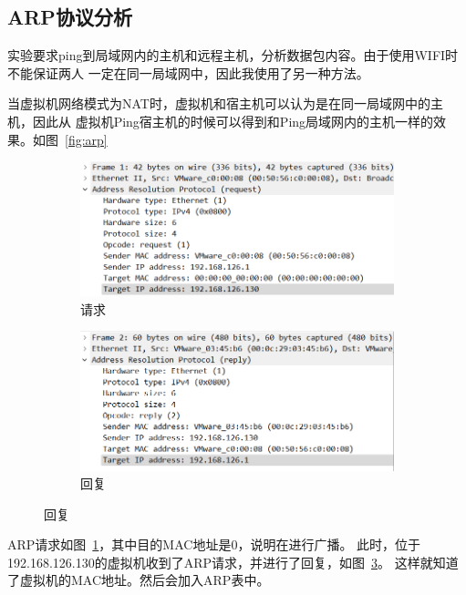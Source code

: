\documentclass[a4paper,twoside]{article}
\begin{document}
\begin{spacing}{1.2}
\subsection{ARP协议分析}

实验要求ping到局域网内的主机和远程主机，分析数据包内容。由于使用WIFI时不能保证两人
一定在同一局域网中，因此我使用了另一种方法。

当虚拟机网络模式为NAT时，虚拟机和宿主机可以认为是在同一局域网中的主机，因此从
虚拟机Ping宿主机的时候可以得到和Ping局域网内的主机一样的效果。如图~\ref{fig:arp}

\begin{figure}[H]
	\centering
	\caption{ARP请求}
	\label{fig:arp}
	\begin{subfigure}{0.4\textwidth}
		\centering
		\includegraphics[width=\textwidth]{arp_req.png}
		\caption{请求}
		\label{fig:arp_req}
	\end{subfigure}
	\begin{subfigure}{0.4\textwidth}
		\centering
		\includegraphics[width=\textwidth]{arp_rep.png}
		\caption{回复}
		\label{fig:arp_rep}
	\end{subfigure}
\end{figure}

ARP请求如图~\ref{fig:arp_req}，其中目的MAC地址是0，说明在进行广播。
此时，位于192.168.126.130的虚拟机收到了ARP请求，并进行了回复，如图~\ref{fig:arp_rep}。
这样就知道了虚拟机的MAC地址。然后会加入ARP表中。


\end{spacing}
\end{document}
